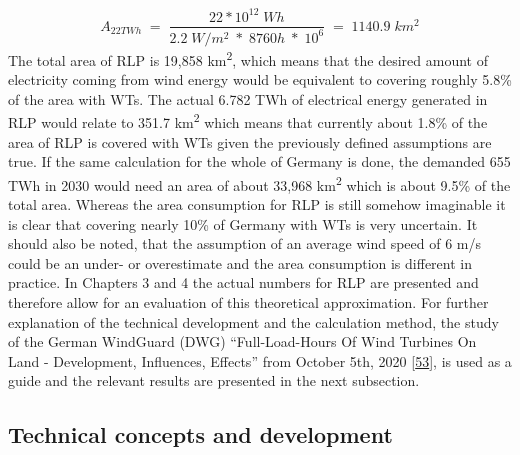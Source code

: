 \documentclass[a4paper,11pt]{article}
\begin{document}
\begin{equation}
A_{22TWh}\;=\;\frac{22 * 10^{12}\; Wh}{2.2\;W/m^2\; *\; 8760h\; *\; 10^6}\;=\;1140.9\;km^2
\end{equation}
The total area of RLP is 19,858 km\textsuperscript{2}, which means that the desired amount of electricity coming from wind energy would be equivalent to covering roughly 5.8\% of the area with WTs. The actual 6.782 TWh of electrical energy generated in RLP would relate to 351.7 km\textsuperscript{2} which means that currently about 1.8\% of the area of RLP is covered with WTs given the previously defined assumptions are true. If the same calculation for the whole of Germany is done, the demanded 655 TWh in 2030 would need an area of about 33,968 km\textsuperscript{2} which is about 9.5\% of the total area. Whereas the area consumption for RLP is still somehow imaginable it is clear that covering nearly 10\% of Germany with WTs is very uncertain. It should also be noted, that the assumption of an average wind speed of 6 m/s could be an under- or overestimate and the area consumption is different in practice. In Chapters 3 and 4 the actual numbers for RLP are presented and therefore allow for an evaluation of this theoretical approximation.
For further explanation of the technical development and the calculation method, the study of the German WindGuard (DWG) ``Full-Load-Hours Of Wind Turbines On Land - Development, Influences, Effects'' from October 5th, 2020 {[}\protect\hyperlink{ref-RasmusBorrmannDr.KnudRehfeldtDr.DennisKruse.2020}{53}{]}, is used as a guide and the relevant results are presented in the next subsection.

\hypertarget{technical-concepts-and-development}{%
\subsection{Technical concepts and development}\label{technical-concepts-and-development}}
\end{document}
